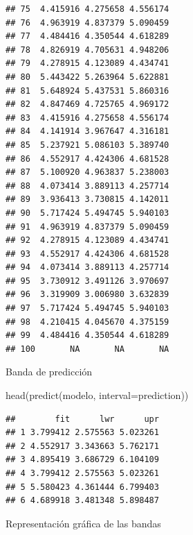 \documentclass[
]{book}
\newenvironment{Shaded}{\begin{snugshade}}{\end{snugshade}}
\newcommand{\AttributeTok}[1]{\textcolor[rgb]{0.77,0.63,0.00}{#1}}
\newcommand{\FunctionTok}[1]{\textcolor[rgb]{0.00,0.00,0.00}{#1}}
\newcommand{\NormalTok}[1]{#1}
\newcommand{\StringTok}[1]{\textcolor[rgb]{0.31,0.60,0.02}{#1}}
\theoremstyle{break}
\begin{document}
\begin{verbatim}
## 75  4.415916 4.275658 4.556174
## 76  4.963919 4.837379 5.090459
## 77  4.484416 4.350544 4.618289
## 78  4.826919 4.705631 4.948206
## 79  4.278915 4.123089 4.434741
## 80  5.443422 5.263964 5.622881
## 81  5.648924 5.437531 5.860316
## 82  4.847469 4.725765 4.969172
## 83  4.415916 4.275658 4.556174
## 84  4.141914 3.967647 4.316181
## 85  5.237921 5.086103 5.389740
## 86  4.552917 4.424306 4.681528
## 87  5.100920 4.963837 5.238003
## 88  4.073414 3.889113 4.257714
## 89  3.936413 3.730815 4.142011
## 90  5.717424 5.494745 5.940103
## 91  4.963919 4.837379 5.090459
## 92  4.278915 4.123089 4.434741
## 93  4.552917 4.424306 4.681528
## 94  4.073414 3.889113 4.257714
## 95  3.730912 3.491126 3.970697
## 96  3.319909 3.006980 3.632839
## 97  5.717424 5.494745 5.940103
## 98  4.210415 4.045670 4.375159
## 99  4.484416 4.350544 4.618289
## 100       NA       NA       NA
\end{verbatim}

Banda de predicción

\begin{Shaded}
\begin{Highlighting}[]
\FunctionTok{head}\NormalTok{(}\FunctionTok{predict}\NormalTok{(modelo, }\AttributeTok{interval=}\StringTok{\textquotesingle{}prediction\textquotesingle{}}\NormalTok{))}
\end{Highlighting}
\end{Shaded}

\begin{verbatim}
##        fit      lwr      upr
## 1 3.799412 2.575563 5.023261
## 2 4.552917 3.343663 5.762171
## 3 4.895419 3.686729 6.104109
## 4 3.799412 2.575563 5.023261
## 5 5.580423 4.361444 6.799403
## 6 4.689918 3.481348 5.898487
\end{verbatim}

Representación gráfica de las bandas
\end{document}
